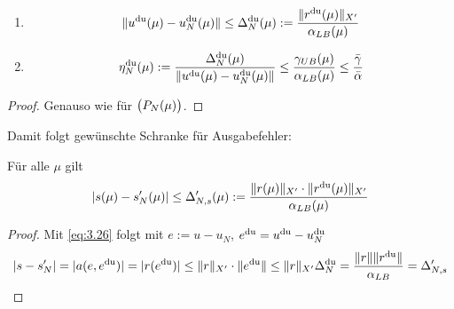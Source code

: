 \begin{satz} \beginwithlist
	\begin{enumerate}
		\item
			\[
				\|u^{\mathrm{du}}(\mu)-u_N^{\mathrm{du}}(\mu)\| \leq \Delta_N^{\mathrm{du}}(\mu) := \frac{\|r^{\mathrm{du}}(\mu)\|_{X'}}{\alpha_{LB}(\mu)}
			\]
		\item
			\[
				\eta_N^{\mathrm{du}}(\mu) := \frac{\Delta_N^{\mathrm{du}}(\mu)}{\|u^{\mathrm{du}}(\mu)-u_N^{\mathrm{du}}(\mu)\|} \leq \frac{\gamma_{UB}(\mu)}{\alpha_{LB}(\mu)} \leq \frac{\bar\gamma}{\bar\alpha}
			\]
	\end{enumerate}

	\begin{proof}
		Genauso wie für $\big(P_N(\mu)\big)$.
	\end{proof}
\end{satz}

Damit folgt gewünschte Schranke für Ausgabefehler:

\begin{satz}
	Für alle $\mu$ gilt
	\[
		|s(\mu)-s_N'(\mu)| \leq \Delta_{N,s}'(\mu) := \frac{\|r(\mu)\|_{X'} \cdot \|r^{\mathrm{du}}(\mu)\|_{X'}}{\alpha_{LB}(\mu)}
	\]

	\begin{proof}
		Mit \eqref{eq:3.26} folgt mit $e := u-u_N$, $e^{\mathrm{du}} = u^{\mathrm{du}}-u_N^{\mathrm{du}}$
		\[
			|s-s_N'| = |a(e,e^{\mathrm{du}})| = |r(e^{\mathrm{du}})| \leq \|r\|_{X'} \cdot \|e^{\mathrm{du}}\| \leq \|r\|_{X'} \Delta_N^{\mathrm{du}} = \frac{\|r\| \|r^{\mathrm{du}}\|}{\alpha_{LB}} = \Delta_{N,s}'
		\]
	\end{proof}
\end{satz}

